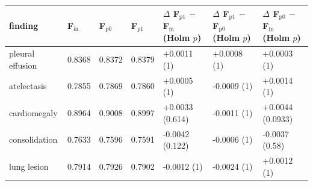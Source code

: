 \begin{tabular}{lllllll}
\toprule
finding & F$_\mathrm{in}$ & F$_\mathrm{p0}$ & F$_\mathrm{p1}$ & $\Delta$ F$_\mathrm{p1}$ $-$ F$_\mathrm{in}$ (Holm $p$) & $\Delta$ F$_\mathrm{p1}$ $-$ F$_\mathrm{p0}$ (Holm $p$) & $\Delta$ F$_\mathrm{p0}$ $-$ F$_\mathrm{in}$ (Holm $p$) \\
\midrule
pleural effusion & 0.8368 & 0.8372 & 0.8379 & +0.0011 (1) & +0.0008 (1) & +0.0003 (1) \\
atelectasis & 0.7855 & 0.7869 & 0.7860 & +0.0005 (1) & -0.0009 (1) & +0.0014 (1) \\
cardiomegaly & 0.8964 & 0.9008 & 0.8997 & +0.0033 (0.614) & -0.0011 (1) & +0.0044 (0.0933) \\
consolidation & 0.7633 & 0.7596 & 0.7591 & -0.0042 (0.122) & -0.0006 (1) & -0.0037 (0.58) \\
lung lesion & 0.7914 & 0.7926 & 0.7902 & -0.0012 (1) & -0.0024 (1) & +0.0012 (1) \\
\bottomrule
\end{tabular}
